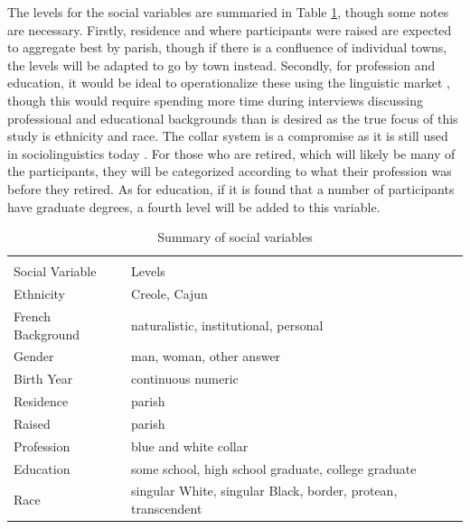 \documentclass{article}\usepackage[]{graphicx}\usepackage[]{xcolor}
\begin{document}
      The levels for the social variables are summaried in Table \ref{tab:social_vars}, though some notes are necessary.
      Firstly, residence and where participants were raised are expected to aggregate best by parish, though if there is a confluence of individual towns, the levels will be adapted to go by town instead.
      Secondly, for profession and education, it would be ideal to operationalize these using the linguistic market \parencite{sankoff_linguistic_1978}, though this would require spending more time during interviews discussing professional and educational backgrounds than is desired as the true focus of this study is ethnicity and race.
      The collar system is a compromise as it is still used in sociolinguistics today \parencite[e.g.,][]{dodsworth_social_2017, forrest_community_2015}.
      For those who are retired, which will likely be many of the participants, they will be categorized according to what their profession was before they retired.
      As for education, if it is found that a number of participants have graduate degrees, a fourth level will be added to this variable.

      \begin{table}[tbhp]
        \centering
        \caption{Summary of social variables}
        \label{tab:social_vars}
        \begin{tabular}{l l}
                            & \\
          Social Variable   & Levels \\
          \hline
          Ethnicity         & Creole, Cajun \\
          French Background & naturalistic, institutional, personal \\
          Gender            & man, woman, other answer \\
          Birth Year        & continuous numeric \\
          Residence         & parish \\
          Raised            & parish \\
          Profession        & blue and white collar \\
          Education         & some school, high school graduate, college graduate \\
          Race              & singular White, singular Black, border, protean, transcendent
        \end{tabular}
      \end{table}
\end{document}
